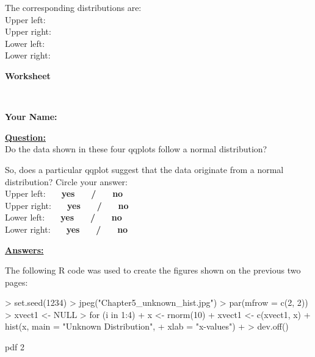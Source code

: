 \documentclass[12pt,letterpaper,final]{article}
\begin{document}
The corresponding distributions are: \\[0.5cm]
%
Upper left: \underline{\hspace*{3cm}} \\[0.2cm]
Upper right: \underline{\hspace*{3cm}} \\[0.2cm]
Lower left: \underline{\hspace*{3cm}} \\[0.2cm]
Lower right: \underline{\hspace*{3cm}}


\newpage


\centerline{\Large \bf Worksheet}~\\

\centerline{\hfill {\large \bf Your Name:} \underline{\hspace*{5cm}}}


\underline{\bf Question:} \\

Do the data shown in these four qqplots follow a normal
distribution?


So, does a particular qqplot suggest that the data 
originate from a normal distribution? Circle your answer: \\[0.5cm]
%
Upper left: {\bf ~~ yes ~~ / ~~ no} \\[0.2cm]
Upper right: {\bf ~~ yes ~~ / ~~ no} \\[0.2cm]
Lower left: {\bf ~~ yes ~~ / ~~ no} \\[0.2cm]
Lower right: {\bf ~~ yes ~~ / ~~ no}


\newpage


\if{}

\underline{\bf Answers:}

The following R code was used to create the figures shown on the previous
two pages:

\begin{Schunk}
\begin{Sinput}
> set.seed(1234)
> jpeg("Chapter5_unknown_hist.jpg")
> par(mfrow = c(2, 2))
> xvect1 <- NULL
> for (i in 1:4) {
+   x <- rnorm(10)
+   xvect1 <- c(xvect1, x)
+   hist(x, main = "Unknown Distribution",
+     xlab = "x-values")
+ }
> dev.off()
\end{Sinput}
\begin{Soutput}
pdf 
  2 
\end{Soutput}
\end{Schunk}
\end{document}
